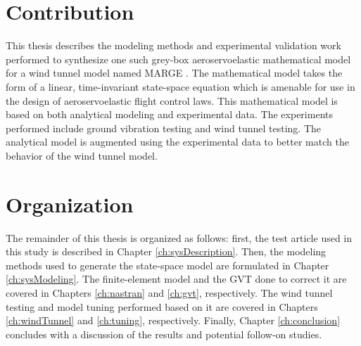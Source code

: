 \section{Contribution}

This thesis describes the modeling methods and experimental validation work performed to synthesize one such grey-box aeroservoelastic mathematical model for a wind tunnel model named MARGE \cite{Quenzer2019}. The mathematical model takes the form of a linear, time-invariant state-space equation which is amenable for use in the design of aeroservoelastic flight control laws. This mathematical model is based on both analytical modeling and experimental data. The experiments performed include ground vibration testing and wind tunnel testing. The analytical model is augmented using the experimental data to better match the behavior of the wind tunnel model.

%
%

\section{Organization} %

The remainder of this thesis is organized as follows: first, the test article used in this study is described in Chapter \ref{ch:sysDescription}. Then, the modeling methods used to generate the state-space model are formulated in Chapter \ref{ch:sysModeling}. The finite-element model and the GVT done to correct it are covered in Chapters \ref{ch:nastran} and \ref{ch:gvt}, respectively. The wind tunnel testing and model tuning performed based on it are covered in Chapters \ref{ch:windTunnel} and \ref{ch:tuning}, respectively. Finally, Chapter \ref{ch:conclusion} concludes with a discussion of the results and potential follow-on studies.